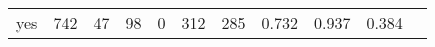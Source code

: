 \begin{longtable}{lp{1.10cm}p{1.10cm}p{1.10cm}p{1.10cm}p{1.10cm}p{1.10cm}p{1.10cm}p{1.10cm}p{1.10cm}p{1.10cm}}
yes       &                    742 &                                 47 &                                98 &                                0 &                               312 &                             285 &                          0.732 &                                 0.937 &                               0.384 \\
\end{longtable}
